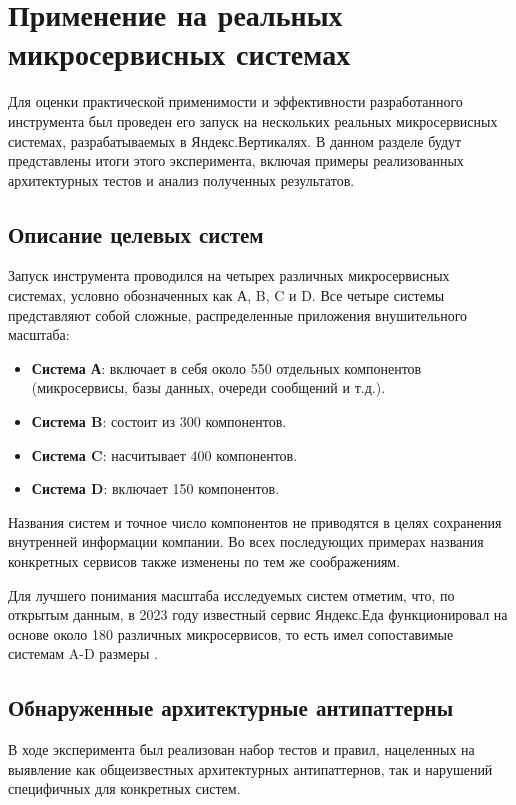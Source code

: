 \section{Применение на реальных микросервисных системах}

Для оценки практической применимости и эффективности разработанного инструмента был проведен его запуск на нескольких реальных микросервисных системах, разрабатываемых в Яндекс.Вертикалях. В данном разделе будут представлены итоги этого эксперимента, включая примеры реализованных архитектурных тестов и анализ полученных результатов. 

\subsection{Описание целевых систем}

Запуск инструмента проводился на четырех различных микросервисных системах, условно обозначенных как А, B, C и D. Все четыре системы представляют собой сложные, распределенные приложения внушительного масштаба:

\begin{itemize}
    \item \textbf{Система А}: включает в себя около 550 отдельных компонентов (микросервисы, базы данных, очереди сообщений и т.д.). 
    \item \textbf{Система B}: состоит из 300 компонентов. 
    \item \textbf{Система C}: насчитывает 400 компонентов. 
    \item \textbf{Система D}: включает 150 компонентов. 
\end{itemize}

Названия систем и точное число компонентов не приводятся в целях сохранения внутренней информации компании. Во всех последующих примерах названия конкретных сервисов также изменены по тем же соображениям.

Для лучшего понимания масштаба исследуемых систем отметим, что, по открытым данным, в 2023 году известный сервис Яндекс.Еда функционировал на основе около 180 различных микросервисов, то есть имел сопоставимые системам A-D размеры \cite{yandex-eda-ms-count}.

\subsection{Обнаруженные архитектурные антипаттерны}

В ходе эксперимента был реализован набор тестов и правил, нацеленных на выявление как общеизвестных архитектурных антипаттернов, так и нарушений специфичных для конкретных систем.

